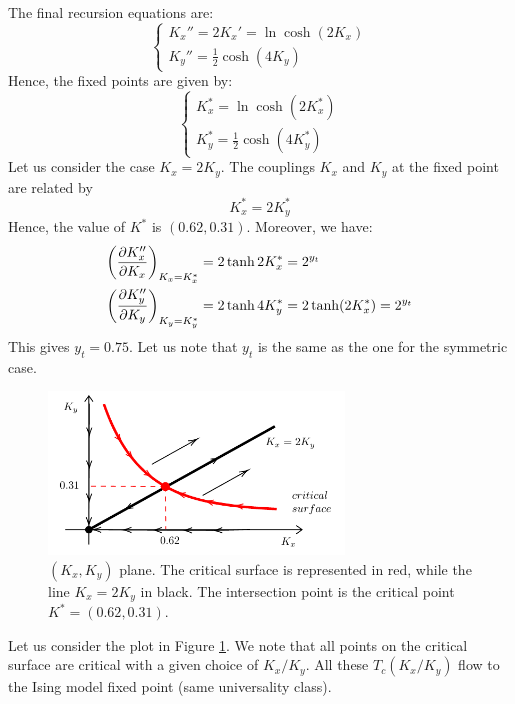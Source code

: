 \documentclass[../../Main/Main.tex]{subfiles}
\begin{document}
The final recursion equations are:
\begin{equation}
  \begin{cases}
     K_x'' = 2 K_x' = \ln \cosh (2K_x) \\
       K_y'' = \frac{1}{2} \cosh (4K_y)
  \end{cases}
\end{equation}
Hence, the fixed points are given by:
\begin{equation}
  \begin{cases}
     K_x^* = \ln \cosh (2K_x^*) \\
       K_y^* = \frac{1}{2} \cosh (4K_y^*)
  \end{cases}
\end{equation}
Let us consider the case \( K_x = 2K_y \).
The couplings \( K_x \) and \( K_y \) at the fixed point are related by
\begin{equation}
  K_x^* = 2 K_y^*
\end{equation}
Hence, the value of \( K^* \) is \( (0.62,0.31) \). Moreover, we have:
\begin{subequations}
\begin{align*}
  \qty(\pdv{K_x''}{K_x} )_{K_x=K_x^*}  &=  2 \tanh 2K_x^* = 2^{y_t} \\
  \qty(\pdv{K_y''}{K_y} )_{K_y=K_y^*}  &=  2 \tanh 4K_y^* =  2 \tanh (2K_x^*) =2^{y_t}
\end{align*}
\end{subequations}
This gives \( y_t = 0.75 \). Let us note that \( y_t \) is the same as the one for the symmetric case.

\begin{figure}[H]
\centering
\includegraphics[width=0.7\textwidth]{./img/18.pdf}
\caption{\label{fig:20_15} \( (K_x,K_y) \) plane. The critical surface is represented in red, while the line \( K_x = 2 K_y \) in black. The intersection point is the critical point \( K^* = (0.62,0.31) \).  }
\end{figure}

Let us consider the plot in Figure \ref{fig:20_15}. We note that all points on the critical surface are critical with a given choice of \( K_x/K_y \). All these \( T_c (K_x/K_y) \) flow to the Ising model fixed point (same universality class).
\end{document}
